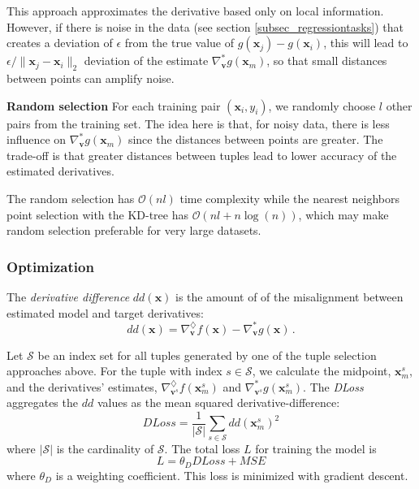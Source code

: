 \documentclass[conference]{IEEEtran}
\begin{document}
This approach approximates the derivative based only on local information. 
However, if there is noise in the data (see section \ref{subsec_regressiontasks}) that creates a deviation of $\epsilon$ from the true value of $g(\mathbf{x}_j)-g(\mathbf{x}_i)$, this will lead to 
$ \epsilon / \|\mathbf{x}_j-\mathbf{x}_i\|_2 $ deviation of the estimate $\nabla_\textbf{v}^* g(\mathbf{x}_m)$, so that small distances between points can amplify noise. 

\textbf{Random selection} 
For each training pair $(\mathbf{x}_i, y_i)$, we randomly choose $l$ other pairs from the training set. 
The idea here is that, for noisy data, there is less influence on $\nabla_\textbf{v}^* g(\mathbf{x}_m)$ since the distances between points are greater. 
The trade-off is that greater distances between tuples lead to lower accuracy of the estimated derivatives.

The random selection has $\mathcal{O}(nl)$ time complexity while the nearest neighbors point selection with the KD-tree has $\mathcal{O}(nl + n \log(n))$, which may make random selection preferable for very large datasets.

\subsubsection{Optimization}
\label{subsec_optimization}
The \emph{derivative difference} $dd(\mathbf{x})$ is the amount of of the misalignment between estimated model and target derivatives: 
\begin{equation}
 dd(\mathbf{x}) = \nabla^{\diamondsuit}_{\mathbf{v}}f(\mathbf{x}) - \nabla^{*}_{\mathbf{v}}g(\mathbf{x})\,.
\end{equation}

Let $\mathcal S$ be an index set for all tuples generated by one of the tuple selection approaches above. For the tuple with index $s\in\mathcal S$, we calculate the midpoint, $\mathbf{x}_m^{s}$, and the derivatives' estimates, $\nabla^{\diamondsuit}_{\mathbf{v}^s}f(\mathbf{x}_m^{s})$ and $\nabla^{*}_{\mathbf{v}^s}g(\mathbf{x}_m^{s})$. 
The \emph{DLoss} aggregates the $dd$ values as the mean squared derivative-difference:
\begin{equation}
 DLoss = \frac{1}{|\mathcal S|} \sum_{s\in\mathcal S} dd(\mathbf{x}_m^{s})^2
\end{equation} 
where $|\mathcal S|$ is the cardinality of $\mathcal S$. The total loss $L$ for training the model is
\begin{equation}
 L = \theta_{D} DLoss + MSE
\end{equation}
where $\theta_{D}$ is a weighting coefficient. 
This loss is minimized with gradient descent. 
\end{document}
